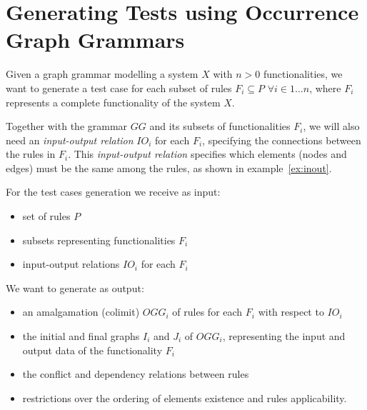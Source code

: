 \section{Generating Tests using Occurrence Graph Grammars}

Given a graph grammar \graphGrammar{} modelling a system $X$ with $n > 0$ functionalities, we want to generate a test case for each subset of rules $F_i \subseteq P$ $\forall i \in 1\ldots n$, where $F_i$ represents a complete functionality  of the system $X$.

Together with the grammar $GG$ and its subsets of functionalities $F_i$, we will also need an \emph{input-output relation} $IO_i$ for each $F_i$, specifying the connections between the rules in $F_i$. This \emph{input-output relation} specifies which elements (nodes and edges) must be the same among the rules, as shown in example~\ref{ex:inout}.

\begin{example}\label{ex:inout}
\end{example}

For the test cases generation we receive as input:

\begin{itemize}
\item set of rules $P$
\item subsets representing functionalities $F_i$
\item input-output relations $IO_i$ for each $F_i$
\end{itemize}

We want to generate as output:

\begin{itemize}
\item an amalgamation (colimit) $OGG_i$ of rules for each $F_i$ with respect to $IO_i$
\item the initial and final graphs $I_i$ and $J_i$ of $OGG_i$, representing the input and output data of the functionality $F_i$
\item the conflict and dependency relations between rules 
\item restrictions over the ordering of elements existence and rules applicability.
\end{itemize}

\begin{example}
\end{example}


